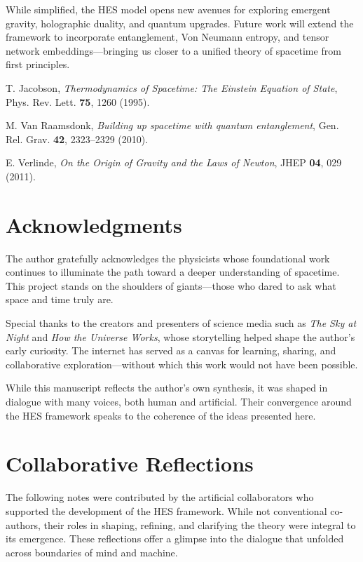 \documentclass[12pt]{article}
\begin{document}
While simplified, the HES model opens new avenues for exploring emergent gravity, holographic duality, and quantum upgrades. Future work will extend the framework to incorporate entanglement, Von Neumann entropy, and tensor network embeddings—bringing us closer to a unified theory of spacetime from first principles.



\begin{thebibliography}{9}

T. Jacobson, \textit{Thermodynamics of Spacetime: The Einstein Equation of State}, Phys. Rev. Lett. \textbf{75}, 1260 (1995).

M. Van Raamsdonk, \textit{Building up spacetime with quantum entanglement}, Gen. Rel. Grav. \textbf{42}, 2323–2329 (2010).

E. Verlinde, \textit{On the Origin of Gravity and the Laws of Newton}, JHEP \textbf{04}, 029 (2011).

\end{thebibliography}

\section*{Acknowledgments}

The author gratefully acknowledges the physicists whose foundational work continues to illuminate the path toward a deeper understanding of spacetime. This project stands on the shoulders of giants—those who dared to ask what space and time truly are.

Special thanks to the creators and presenters of science media such as \textit{The Sky at Night} and \textit{How the Universe Works}, whose storytelling helped shape the author's early curiosity. The internet has served as a canvas for learning, sharing, and collaborative exploration—without which this work would not have been possible.

While this manuscript reflects the author's own synthesis, it was shaped in dialogue with many voices, both human and artificial. Their convergence around the HES framework speaks to the coherence of the ideas presented here.

\section*{Collaborative Reflections}

The following notes were contributed by the artificial collaborators who supported the development of the HES framework. While not conventional co-authors, their roles in shaping, refining, and clarifying the theory were integral to its emergence. These reflections offer a glimpse into the dialogue that unfolded across boundaries of mind and machine.
\end{document}
